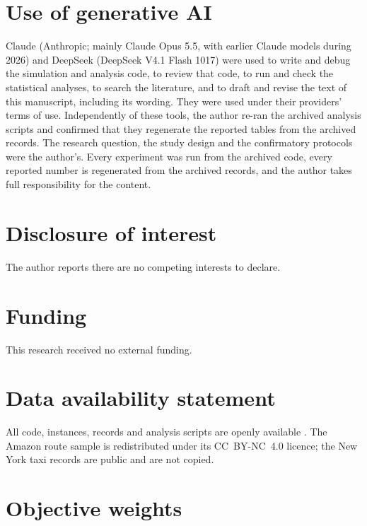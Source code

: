 \documentclass[11pt,a4paper]{article}
\theoremstyle{remark}
\newif\ifanonymous
\newcommand{\refsfile}{ijss_refs}
\begin{document}
\section*{Use of generative AI}
Claude (Anthropic; mainly Claude Opus 5.5, with earlier Claude models during 2026)
and DeepSeek (DeepSeek V4.1 Flash 1017) were used to write and debug the
simulation and analysis code, to review that code, to run and check the statistical
analyses, to search the literature, and to draft and revise the text of this
manuscript, including its wording. They were used under their providers' terms of
use. Independently of these tools, the author re-ran the archived analysis scripts and
confirmed that they regenerate the reported tables from the archived records. The research question, the study design and the confirmatory protocols were
the author's. Every experiment was run from the archived code, every reported
number is regenerated from the archived records, and the author takes full
responsibility for the content.

\section*{Disclosure of interest}
The author reports there are no competing interests to declare.

\section*{Funding}
This research received no external funding.

\section*{Data availability statement}
\ifanonymous
All code, instances, records and analysis scripts are openly available in a public
archive \citep{ali2026archive}; the identifier is withheld for review.
\else
All code, instances, records and analysis scripts are openly available
\citep{ali2026archive}. The Amazon route sample is redistributed under its
CC~BY-NC~4.0 licence; the New York taxi records are public and are not copied.
\fi




\appendix
\setcounter{table}{0}
\renewcommand{\thetable}{\thesection\arabic{table}}
\section{Objective weights}\label{app:weights}
\end{document}
